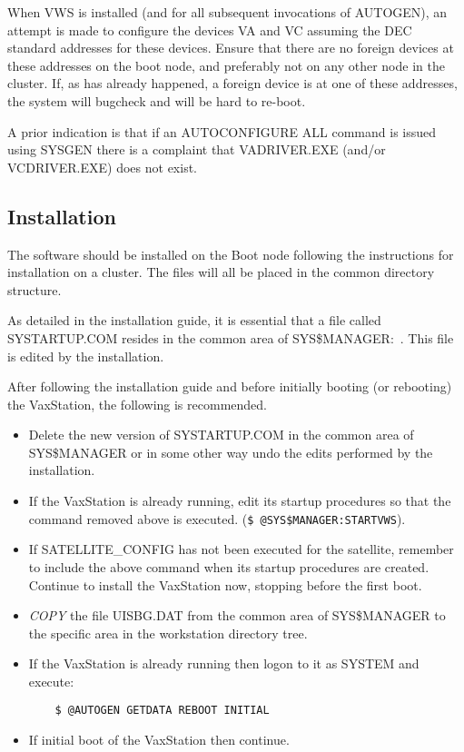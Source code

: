 When VWS is installed (and for all subsequent invocations of AUTOGEN), an
attempt is made to configure the devices VA and VC assuming the DEC standard
addresses for these devices.
Ensure that there are no foreign devices at these addresses on the boot node,
and preferably not on any other node in the cluster.
If, as has already happened, a foreign device is at one of these addresses,
the system will bugcheck and will be hard to re-boot.

A prior indication is that if an AUTOCONFIGURE ALL command is issued
using SYSGEN there is a complaint that VADRIVER.EXE (and/or VCDRIVER.EXE)
does not exist.

\subsection {Installation}

The software should be installed on the Boot node following the instructions
for installation on a cluster.
The files will all be placed in the common directory structure.

As detailed in the installation guide, it is essential that a file called
SYSTARTUP.COM resides in the common area of SYS\$MANAGER:~.
This file is edited by the installation.

After following the installation guide and before initially booting (or
rebooting) the VaxStation, the following is recommended.
\begin {itemize}
\item Delete the new version of SYSTARTUP.COM in the common area of
SYS\$MANAGER or in some other way undo the edits performed by the installation.
\item If the VaxStation is already running, edit its startup procedures
so that the command removed above is executed.
({\tt \$ @SYS\$MANAGER:STARTVWS}).
\item If SATELLITE\_CONFIG has not been executed for the satellite, remember
to include the above command when its startup procedures are created.
Continue to install the VaxStation now, stopping before the first boot.
\item {\em COPY} the file  UISBG.DAT from the common area of SYS\$MANAGER to the
specific area in the workstation directory tree.
\item If the VaxStation is already running then logon to it as SYSTEM and
execute:
\begin{verbatim}
    $ @AUTOGEN GETDATA REBOOT INITIAL
\end{verbatim}
\item If initial boot of the VaxStation then continue.
\end {itemize}

